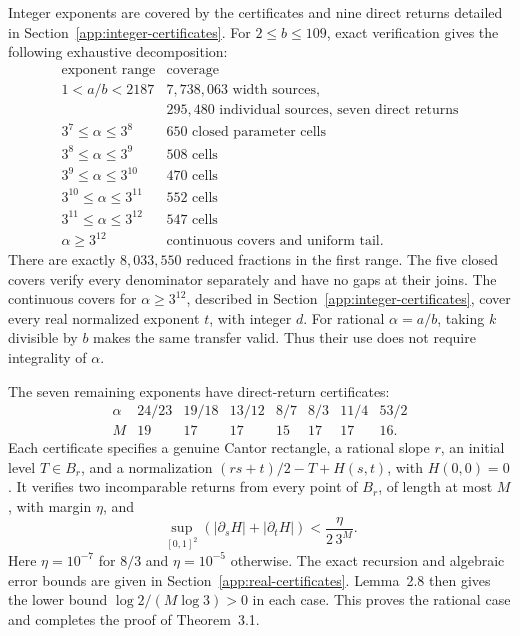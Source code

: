 \documentclass[11pt,a4paper]{article}
\begin{document}
Integer exponents are covered by the certificates and nine direct
returns detailed in Section~\ref{app:integer-certificates}.
For \(2\leq b\leq109\), exact verification gives the following
exhaustive decomposition:
\[
\begin{array}{c|l}
\text{exponent range}&\text{coverage}\\ \hline
1<a/b<2187&7{,}738{,}063\text{ width sources},\\
 &295{,}480\text{ individual sources, seven direct returns}\\
3^7\leq \alpha\leq3^8&650\text{ closed parameter cells}\\
3^8\leq \alpha\leq3^9&508\text{ cells}\\
3^9\leq \alpha\leq3^{10}&470\text{ cells}\\
3^{10}\leq \alpha\leq3^{11}&552\text{ cells}\\
3^{11}\leq \alpha\leq3^{12}&547\text{ cells}\\
\alpha\geq3^{12}&\text{continuous covers and uniform tail}.
\end{array}
\]
There are exactly \(8{,}033{,}550\) reduced fractions in the first
range. The five closed covers verify every denominator separately
and have no gaps at their joins. The continuous covers for
\(\alpha\geq3^{12}\), described in Section~\ref{app:integer-certificates},
cover every real normalized exponent \(t\), with integer \(d\).
For rational \(\alpha=a/b\), taking \(k\) divisible by \(b\) makes the
same transfer valid. Thus their use does not require integrality
of \(\alpha\).

The seven remaining exponents have direct-return certificates:
\[
\begin{array}{c|rrrrrrr}
\alpha&24/23&19/18&13/12&8/7&8/3&11/4&53/2\\ \hline
M&19&17&17&15&17&17&16.
\end{array}
\]
Each certificate specifies a genuine Cantor rectangle, a rational
slope \(r\), an initial level \(T\in B_r\), and a normalization
\((rs+t)/2-T+H(s,t)\), with \(H(0,0)=0\).
It verifies two incomparable returns from every point of \(B_r\),
of length at most \(M\), with margin \(\eta\), and
\[
\sup_{[0,1]^2}(|\partial_sH|+|\partial_tH|)
<\frac{\eta}{2\,3^M}.
\]
Here \(\eta=10^{-7}\) for \(8/3\) and \(\eta=10^{-5}\) otherwise.
The exact recursion and algebraic error bounds are given in
Section~\ref{app:real-certificates}. Lemma~2.8
then gives the lower bound \(\log2/(M\log3)>0\) in each case.
This proves the rational case and completes the proof of
Theorem~3.1.
\end{document}

